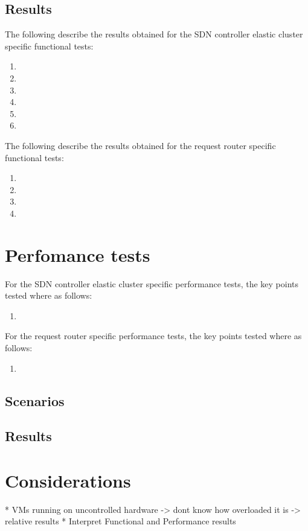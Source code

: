 \subsection{Results}
\label{section:functional-tests-results}
%
The following describe the results obtained for the \gls{SDN} controller elastic cluster specific functional tests:
\begin{enumerate}
	\item 
	\item 
	\item 
	\item 
	\item 
	\item 
\end{enumerate}
%
The following describe the results obtained for the request router specific functional tests:
\begin{enumerate}
	\item 
	\item 
	\item 
	\item 
\end{enumerate}
%
\section{Perfomance tests}
\label{section:performance-tests}
For the \gls{SDN} controller elastic cluster specific performance tests, the key points tested where as follows:
\begin{enumerate}
	\item 
\end{enumerate}
%
For the request router specific performance tests, the key points tested where as follows:
\begin{enumerate}
	\item 
\end{enumerate}
%
%
\subsection{Scenarios}
\label{subsection:performance-tests-scenarios}

%
\subsection{Results}
\label{subsection:performance-tests-results}

%
\section{Considerations}
\label{section:considerations}
* VMs running on uncontrolled hardware -> dont know how overloaded it is -> relative results
* Interpret Functional and Performance results